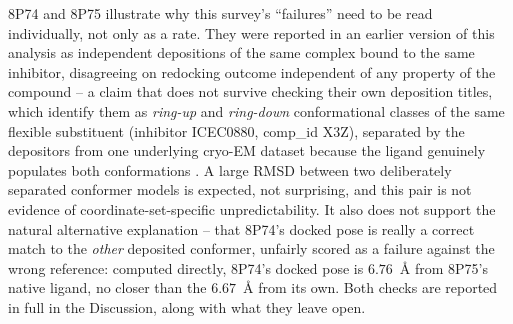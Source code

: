 \documentclass[11pt]{article}
\begin{document}
8P74 and 8P75 illustrate why this survey's ``failures'' need to be read
individually, not only as a rate. They were reported in an earlier
version of this analysis as independent depositions of the same complex
bound to the same inhibitor, disagreeing on redocking outcome
independent of any property of the compound -- a claim that does not
survive checking their own deposition titles, which identify them as
\emph{ring-up} and \emph{ring-down} conformational classes of the same
flexible substituent (inhibitor ICEC0880, comp\_id X3Z), separated by the
depositors from one underlying cryo-EM dataset because the ligand
genuinely populates both conformations \citep{cushing2024}. A large RMSD
between two deliberately separated conformer models is expected, not
surprising, and this pair is not evidence of coordinate-set-specific
unpredictability. It also does not support the natural alternative
explanation -- that 8P74's docked pose is really a correct match to the
\emph{other} deposited conformer, unfairly scored as a failure against
the wrong reference: computed directly, 8P74's docked pose is
$6.76$~{\AA} from 8P75's native ligand, no closer than the $6.67$~{\AA}
from its own. Both checks are reported in full in the Discussion, along
with what they leave open.
\end{document}
